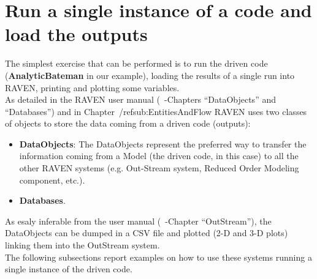 \section{Run a single instance of a code and load the outputs}
The simplest exercise that can be performed is to run the driven code (\textbf{AnalyticBateman}  in our example), loading the results of a single run into RAVEN, printing and plotting some variables.
\\ As detailed in the RAVEN user manual (~\cite{RAVENuserManual}-Chapters ``DataObjects''  and ``Databases'') and in Chapter~/ref{sub:EntitiesAndFlow} RAVEN uses two classes of objects to store the data coming from a driven code (outputs):
\begin{itemize}
  \item \textbf{DataObjects}: The DataObjects represent the preferred way to transfer the information coming from a 
   Model (the driven code, in this case) to all the other RAVEN systems (e.g. Out-Stream system, Reduced Order Modeling
   component, etc.). 
  \item \textbf{Databases}.
\end{itemize}

As esaly inferable from the user manual (~\cite{RAVENuserManual}-Chapter ``OutStream''), the DataObjects can be dumped in a CSV file and plotted (2-D and 3-D plots) linking them into the OutStream system.
\\ The following subsections report examples on how to use these systems running a single instance of the driven code.
